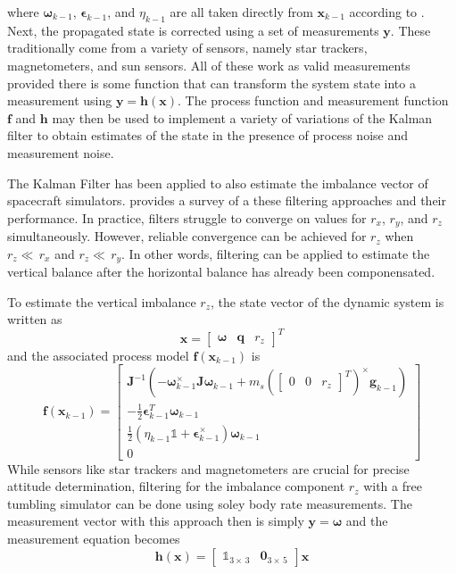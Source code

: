 where $\bm{\omega}_{k-1}$, $\bm{\epsilon}_{k-1}$, and $\eta_{k-1}$ are all taken directly from $\bm{x}_{k-1}$ according to . Next, the propagated state is corrected using a set of measurements $\bm{y}$. These traditionally come from a variety of sensors, namely star trackers, magnetometers, and sun sensors. All of these work as valid measurements provided there is some function that can transform the system state into a measurement using $\bm{y} = \bm{h}(\bm{x})$. The process function and measurement function $\bm{f}$ and $\bm{h}$ may then be used to implement a variety of variations of the Kalman filter to obtain estimates of the state in the presence of process noise and measurement noise.

The Kalman Filter has been applied to also estimate the imbalance vector of spacecraft simulators. \cite{silva_filtering_2018} provides a survey of a these filtering approaches and their performance. In practice, filters struggle to converge on values for $r_x$, $r_y$, and $r_z$ simultaneously. However, reliable convergence can be achieved for $r_z$ when $r_z\ll\,r_x$ and $r_z\ll\,r_y$. In other words, filtering can be applied to estimate the vertical balance after the horizontal balance has already been componensated.

To estimate the vertical imbalance $r_z$, the state vector of the dynamic system is written as 
\begin{equation}
    \bm{x} = \begin{bmatrix} \bm{\omega} & \bm{q} & r_z \end{bmatrix}^T
\end{equation}
and the associated process model $\bm{f}(\bm{x}_{k-1})$ is
\begin{equation}\label{equation:UKF_process}
    \bm{f}(\bm{x}_{k-1}) = \begin{bmatrix}
        \bm{J}^{-1}(-\bm{\omega}_{k-1}^\times \bm{J\omega}_{k-1} + m_s
        (\begin{bmatrix}
            0 & 0 & r_z
        \end{bmatrix}^T)^{\times}\bm{g}_{k-1})
        \\
        -\frac{1}{2}\bm{\epsilon}_{k-1}^T\bm{\omega}_{k-1} 
        \\
        \frac{1}{2}(\eta_{k-1}\mathbb{1} + \bm{\epsilon}_{k-1}^{\times})\bm{\omega}_{k-1}
        \\
        0
    \end{bmatrix}
\end{equation}
 While sensors like star trackers and magnetometers are crucial for precise attitude determination, filtering for the imbalance component $r_z$ with a free tumbling simulator can be done using soley body rate measurements. The measurement vector with this approach then is simply $\bm{y}=\bm{\omega}$ and the measurement equation becomes
\begin{equation}
    \bm{h}(\bm{x})= \begin{bmatrix}
        \mathbb{1}_{3\times\,3} & \bm{0}_{3\times\,5}
    \end{bmatrix}\bm{x}
\end{equation}

